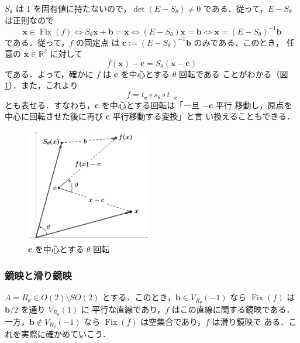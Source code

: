 \documentclass[11pt, uplatex, dvipdfmx, titlepage]{jsarticle}
\DeclareMathOperator{\Fix}{Fix}
\theoremstyle{definition}
\begin{document}
$S_{\theta}$ は $1$ を固有値に持たないので，$\det(E-S_{\theta}) \neq
0$ である．従って，$E-S_{\theta}$ は正則なので
\[
  \bm{x} \in \Fix(f) \Leftrightarrow S_{\theta} \bm{x} +\bm{b} =
  \bm{x} \Leftrightarrow (E-S_{\theta})\bm{x} = \bm{b} \Leftrightarrow
  \bm{x} = \left( E-S_{\theta}\right)^{-1} \bm{b}
\]
である．従って，$f$ の固定点
は $\bm{c}:=\left(E-S_{\theta}\right)^{-1}\bm{b}$ のみである．このとき，
任意の $\bm{x} \in \mathbb{R}^2$ に対して
\[
  f(\bm{x}) - \bm{c} = S_{\theta}(\bm{x}-\bm{c})
\]
である．よって，確かに $f$ は $\bm{c}$ を中心とする $\theta$ 回転である
ことがわかる（図\ref{fig:rotation2gen}）．また，これより
\[
  f = t_{\bm{c}} \circ s_{\theta} \circ t_{-\bm{c}}
\]
とも表せる．すなわち，$\bm{c}$ を中心とする回転は「一旦 $-\bm{c}$ 平行
移動し，原点を中心に回転させた後に再び $\bm{c}$ 平行移動する変換」と言
い換えることもできる．
\begin{figure}[h]
  \centering
  \includegraphics[height=5cm]{pictures/rotation2gen.pdf}
  \caption{$\bm{c}$ を中心とする $\theta$ 回転}
  \label{fig:rotation2gen}
\end{figure}


\subsubsection{鏡映と滑り鏡映}\label{sec:reflection2}

$A=R_{\theta} \in O(2) \setminus SO(2)$
とする．このとき，$\bm{b} \in
V_{R_{\theta}}(-1)$ なら $\Fix(f)$ は $\bm{b}/2$ を通り $V_{R_{\theta}}(1)$ に
平行な直線であり，$f$ はこの直線に関する鏡映である．一方，$\bm{b}
\notin V_{R_{\theta}}(-1)$ なら $\Fix(f)$ は空集合であり，$f$ は滑り鏡映で
ある．これを実際に確かめていこう．
\end{document}
